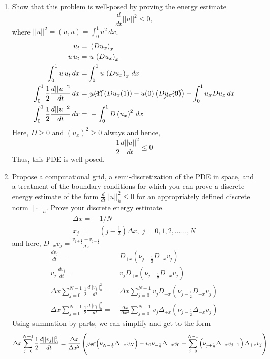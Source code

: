 \documentclass[11pt]{article}
\newcommand{\Dpx}{D_{+x}}
\newcommand{\dpx}{\Delta_{+x}}
\newcommand{\Dmx}{D_{-x}}
\newcommand{\dmx}{\Delta_{-x}}
\newcommand{\dx}{\Delta x}
\newcommand{\bra}[1]{\left(#1\right)}
\newcommand{\inte}[1]{\int_0^1 #1\, dx}
\newcommand{\vj}{v_j}
\newcommand{\njph}{\nu_{j+\frac{1}{2}}}
\newcommand{\dint}[1]{\sum_{j=0}^{N-1}#1}
\newcommand{\h}{\frac{1}{2}}
\begin{document}
\begin{enumerate}
  \begin{enumerate}
    \item {\color{blue}Show that this problem is well-posed by proving the energy estimate}
    \[
      \frac{d}{dt}||u||^2 \le 0,
    \]
    {\color{blue}where} $||u||^2=(u,u)=\int_0^1 u^2\, dx$.
    \begin{align*}
        u_t =& \ \bra{Du_x}_x \\
        u\,u_t =& \ u\,\bra{Du_x}_x \\
        \inte{u\,u_t} =& \inte{u\,\bra{Du_x}_x} \\
        \inte{\frac{1}{2}\frac{d||u||^2}{dt}} =& \ \cancel{u(1)}\bra{Du_x(1)} - u(0)\bra{D\cancel{u_x(0)}} - \inte{u_xDu_x}\\
        \inte{\frac{1}{2}\frac{d||u||^2}{dt}} =& \ -\inte{D\bra{u_x}^2} 
    \end{align*}
    Here, $D\geq0$ and $\bra{u_x}^2 \geq 0$ always and hence,
    \[
    \frac{1}{2}\frac{d||u||^2}{dt} \leq 0
    \]
    Thus, this PDE is well posed.
    \item {\color{blue}Propose a computational grid, a semi-discretization of the PDE in space, and a treatment of the boundary conditions for which you can prove a discrete energy estimate of the form $\frac{d}{dt}||u||^2_h \le 0$ for an appropriately defined discrete norm $||\cdot ||_h$. Prove your discrete energy estimate.}
    \begin{align*}
        \dx =& \ 1/N \\
        x_j =& \ (j-\h)\dx, \; j=0,1,2,\ldots \ldots ,N 
    \end{align*}
    and here, $\Dmx v_j = \frac{v_{j+\h}-v_{j-\h}}{\dx}$
    \begin{align*}
        \frac{d\vj}{dt} =& \ \Dpx\bra{\nu_{j-\frac{1}{2}}\Dmx\vj} \\
        \vj\,\frac{d\vj}{dt} =& \ \vj \Dpx\bra{\nu_{j-\frac{1}{2}}\Dmx\vj} \\
        \dx\dint{\frac{1}{2}\frac{d||\vj||^2_h}{dt}} =& \ \dx\dint{\vj\Dpx\bra{\nu_{j-\frac{1}{2}}\Dmx\vj}} \\
        \dx\dint{\frac{1}{2}\frac{d||\vj||^2_h}{dt}} =& \ \frac{\dx}{\dx^2}\dint{\vj\dpx\bra{\nu_{j-\frac{1}{2}}\dmx\vj}}
    \end{align*}
    Using summation by parts, we can simplify and get to the form
    \begin{align*}
       \dx\dint{\frac{1}{2}\frac{d||\vj||^2_h}{dt}} =& \ \frac{\dx}{\dx^2}\bra{\cancel{v_N}\bra{\nu_{N-\frac{1}{2}}\dmx v_N} -v_0\nu_{-\frac{1}{2}}\dmx v_0 - \dint{\bra{\njph \dmx v_{j+1}}\dpx\vj}} \\

\end{align*}
\end{enumerate}
\end{enumerate}
\end{document}
